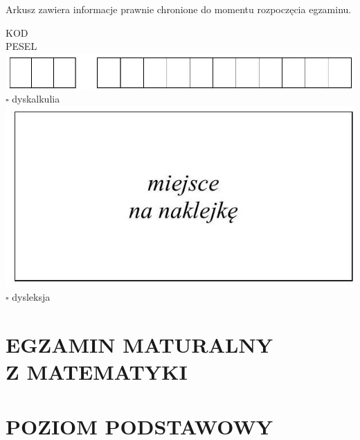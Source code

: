 \documentclass[10pt]{article}
\begin{document}
Arkusz zawiera informacje prawnie chronione do momentu rozpoczęcia egzaminu.

KOD\\
PESEL\\
\includegraphics[max width=\textwidth, center]{2024_11_21_779b7f825da3a12753feg-01(1)}\\
\(\square\) dyskalkulia\\
\includegraphics[max width=\textwidth, center]{2024_11_21_779b7f825da3a12753feg-01}\\
\(\square\) dysleksja

\section*{EGZAMIN MATURALNY \\
 Z MATEMATYKI}
\section*{POZIOM PODSTAWOWY}
\end{document}

